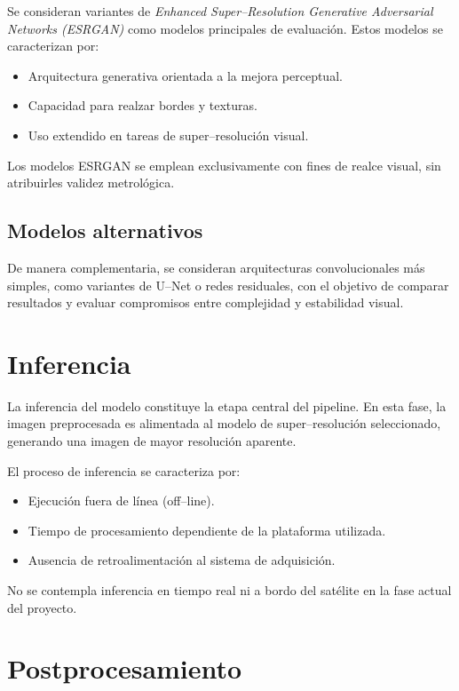 Se consideran variantes de \textit{Enhanced Super--Resolution Generative
Adversarial Networks (ESRGAN)} como modelos principales de evaluación. Estos
modelos se caracterizan por:

\begin{itemize}
    \item Arquitectura generativa orientada a la mejora perceptual.
    \item Capacidad para realzar bordes y texturas.
    \item Uso extendido en tareas de super--resolución visual.
\end{itemize}

Los modelos ESRGAN se emplean exclusivamente con fines de realce visual, sin
atribuirles validez metrológica.

\subsection{Modelos alternativos}

De manera complementaria, se consideran arquitecturas convolucionales más
simples, como variantes de U--Net o redes residuales, con el objetivo de comparar
resultados y evaluar compromisos entre complejidad y estabilidad visual.

\section{Inferencia}

La inferencia del modelo constituye la etapa central del pipeline. En esta fase,
la imagen preprocesada es alimentada al modelo de super--resolución seleccionado,
generando una imagen de mayor resolución aparente.

El proceso de inferencia se caracteriza por:
\begin{itemize}
    \item Ejecución fuera de línea (off--line).
    \item Tiempo de procesamiento dependiente de la plataforma utilizada.
    \item Ausencia de retroalimentación al sistema de adquisición.
\end{itemize}

No se contempla inferencia en tiempo real ni a bordo del satélite en la fase
actual del proyecto.

\section{Postprocesamiento}

